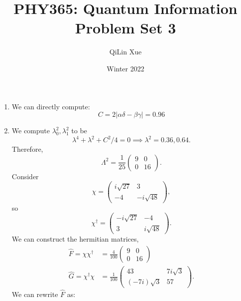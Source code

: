 \documentclass{article}
\title{PHY365: Quantum Information \\ Problem Set 3}
\author{QiLin Xue}
\date{Winter 2022}
\numberwithin{equation}{section}
\begin{document}
\maketitle
\begin{enumerate}
    \item We can directly compute:
    \begin{equation}
        C = 2|\alpha \delta - \beta\gamma| = 0.96
    \end{equation}
    \item We compute $\lambda_0^2,\lambda_1^2$ to be 
    \begin{equation}
        \lambda^4 + \lambda^2 + C^2/4 = 0 \implies \lambda^2 = 0.36, 0.64.
    \end{equation}
    Therefore,
    \begin{equation}
        \Lambda^2 = \frac{1}{25} \begin{pmatrix}
            9 & 0 \\ 
            0 & 16
        \end{pmatrix}.
    \end{equation}
    Consider
    \begin{equation}
        \chi = \begin{pmatrix}
            i\sqrt{27} & 3 \\ 
            -4 & -i\sqrt{48}
        \end{pmatrix},
    \end{equation}
    so 
    \begin{equation}
        \chi^\dagger = \begin{pmatrix}
            -i\sqrt{27} & -4 \\ 
            3 & i\sqrt{48}
        \end{pmatrix}.
    \end{equation}
    We can construct the hermitian matrices,
    \begin{align}
       \hat{F} =  \chi\chi^\dagger &= \frac{4}{100} \begin{pmatrix}
            9 & 0 \\ 
            0 & 16
        \end{pmatrix} \\ 
        \hat{G} = \chi^\dagger\chi &= \frac{1}{100}\begin{pmatrix}
            43 & 7i\sqrt{3} \\ 
            (-7i)\sqrt{3} & 57
        \end{pmatrix}.
    \end{align}
    We can rewrite $\hat{F}$ as:

\end{enumerate}
\end{document}
